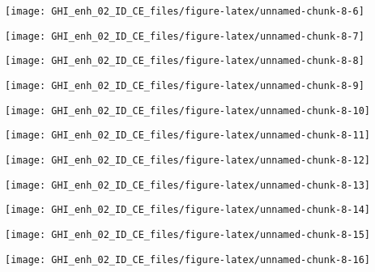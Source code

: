 \documentclass[
  10pt,
  a4paper,oneside]{article}
\begin{document}
\begin{center}\texttt{[image: GHI\_enh\_02\_ID\_CE\_files/figure-latex/unnamed-chunk-8-6]} \end{center}

\begin{center}\texttt{[image: GHI\_enh\_02\_ID\_CE\_files/figure-latex/unnamed-chunk-8-7]} \end{center}

\begin{center}\texttt{[image: GHI\_enh\_02\_ID\_CE\_files/figure-latex/unnamed-chunk-8-8]} \end{center}

\begin{center}\texttt{[image: GHI\_enh\_02\_ID\_CE\_files/figure-latex/unnamed-chunk-8-9]} \end{center}

\begin{center}\texttt{[image: GHI\_enh\_02\_ID\_CE\_files/figure-latex/unnamed-chunk-8-10]} \end{center}

\begin{center}\texttt{[image: GHI\_enh\_02\_ID\_CE\_files/figure-latex/unnamed-chunk-8-11]} \end{center}

\begin{center}\texttt{[image: GHI\_enh\_02\_ID\_CE\_files/figure-latex/unnamed-chunk-8-12]} \end{center}

\begin{center}\texttt{[image: GHI\_enh\_02\_ID\_CE\_files/figure-latex/unnamed-chunk-8-13]} \end{center}

\begin{center}\texttt{[image: GHI\_enh\_02\_ID\_CE\_files/figure-latex/unnamed-chunk-8-14]} \end{center}

\begin{center}\texttt{[image: GHI\_enh\_02\_ID\_CE\_files/figure-latex/unnamed-chunk-8-15]} \end{center}

\begin{center}\texttt{[image: GHI\_enh\_02\_ID\_CE\_files/figure-latex/unnamed-chunk-8-16]} \end{center}
\end{document}
